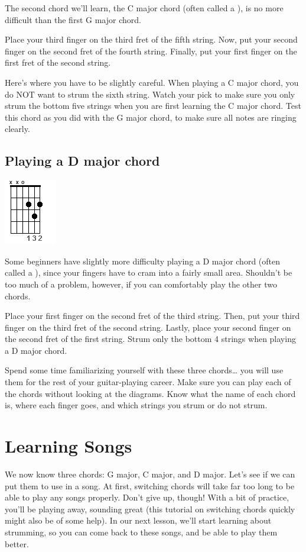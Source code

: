 The second chord we'll learn, the C major chord (often called a ), is
no more difficult than the first G major chord.

Place your third finger on the third fret of the fifth string. Now, put your
second finger on the second fret of the fourth string. Finally, put your first
finger on the first fret of the second string.

Here's where you have to be slightly careful. When playing a C major chord, you
do NOT want to strum the sixth string. Watch your pick to make sure you only
strum the bottom five strings when you are first learning the C major chord.
Test this chord as you did with the G major chord, to make sure all notes are
ringing clearly. 

\subsection{Playing a D major chord}
\includegraphics{partone/opendmajor.png}

Some beginners have slightly more difficulty playing a D major chord (often
called a ), since your fingers have to cram into a fairly small area.
Shouldn't be too much of a problem, however, if you can comfortably play the
other two chords.

Place your first finger on the second fret of the third string. Then, put your
third finger on the third fret of the second string. Lastly, place your second
finger on the second fret of the first string. Strum only the bottom 4 strings
when playing a D major chord.

Spend some time familiarizing yourself with these three chords\ldots{} you will use
them for the rest of your guitar-playing career. Make sure you can play each of
the chords without looking at the diagrams. Know what the name of each chord
is, where each finger goes, and which strings you strum or do not strum. 

\section{Learning Songs}
We now know three chords: G major, C major, and D major. Let's see if we can
put them to use in a song. At first, switching chords will take far too long to
be able to play any songs properly. Don't give up, though! With a bit of
practice, you'll be playing away, sounding great (this tutorial on switching
chords quickly might also be of some help). In our next lesson, we'll start
learning about strumming, so you can come back to these songs, and be able to
play them better.

